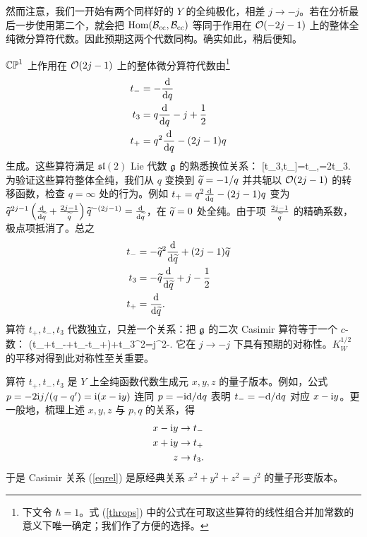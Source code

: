 然而注意，我们一开始有两个同样好的 $Y$ 的全纯极化，相差 $j\to-j$。若在分析最后一步使用第二个，就会把 ${\mathrm{Hom}}({\mathcal B}_{\mathrm{cc}},{\mathcal B}_{\mathrm{cc}})$ 等同于作用在 ${\mathcal O}(-2j-1)$ 上的整体全纯微分算符代数。因此预期这两个代数同构。确实如此，稍后便知。

${\mathbb{CP}}^1$ 上作用在 ${\mathcal O}(2j-1)$ 上的整体微分算符代数由\footnote{下文令 $\hbar=1$。式 (\ref{throps}) 中的公式在可取这些算符的线性组合并加常数的意义下唯一确定；我们作了方便的选择。}
\begin{align}\label{throps}    t_- & = -\frac{{\mathrm d}}{{\mathrm d} q} \cr
                     t_3 & = q\frac{{\mathrm d}}{{\mathrm d} q}-j+\frac{1}{2} \cr
                      t_+ & = q^2\frac{{\mathrm d}}{{\mathrm d} q}-(2j-1)q \end{align}
生成。这些算符满足 $\mathfrak{sl}(2)$ Lie 代数 ${\mathfrak g}$ 的熟悉换位关系：
\be\label{usrel} [t_3,t_\pm]=\pm t_\pm,\qquad [t_+,t_-]=2t_3. \ee
为验证这些算符整体全纯，我们从 $q$ 变换到 $\widetilde q=-1/q$ 并共轭以 ${\mathcal O}(2j-1)$ 的转移函数，检查 $q=\infty$ 处的行为。例如 $t_+=q^2\frac{{\mathrm d}}{{\mathrm d} q}-(2j-1)q$ 变为 $\widetilde q^{2j-1}\left(\frac{{\mathrm d}}{{\mathrm d}\widetilde q}+\frac{2j-1}{\widetilde q}\right)\widetilde q^{-(2j-1)}=\frac{{\mathrm d}}{{\mathrm d}\widetilde q}$，在 $\widetilde q=0$ 处全纯。由于项 $\frac{2j-1}{\widetilde q}$ 的精确系数，极点项抵消了。总之
\begin{align}\label{agrops} t_-& = -\widetilde q^2\frac{{\mathrm d}}{{\mathrm d}\widetilde q}+(2j-1)\widetilde q\cr
                                           t_3& = -\widetilde q\frac{{\mathrm d}}{{\mathrm d}\widetilde q}+j-\frac{1}{2} \cr
                                            t_+ & = \frac{{\mathrm d}}{{\mathrm d}\widetilde q}. \end{align}
算符 $t_+,t_-,t_3$ 代数独立，只差一个关系：把 ${\mathfrak g}$ 的二次 Casimir 算符等于一个 $c$-数：
\be\label{eqrel} (t_+t_-+t_-t_+)+t_3^2=j^2-. \ee
它在 $j\to-j$ 下具有预期的对称性。$K_W^{1/2}$ 的平移对得到此对称性至关重要。

算符 $t_+,t_-,t_3$ 是 $Y$ 上全纯函数代数生成元 $x,y,z$ 的量子版本。例如，公式 $p=-2{\mathrm i} j/(q-q')={\mathrm i}(x-{\mathrm i} y)$ 连同 $p=-{\mathrm i}{\mathrm d}/{\mathrm d} q$ 表明 $t_-=-{\mathrm d}/{\mathrm d} q$ 对应 $x-{\mathrm i} y$。更一般地，梳理上述 $x,y,z$ 与 $p,q$ 的关系，得
\begin{align} \label{correspo} x-{\mathrm i} y &\to t_- \cr
                                             x+{\mathrm i} y &\to t_+ \cr
                                             z& \to t_3. \end{align}
于是 Casimir 关系 (\ref{eqrel}) 是原经典关系 $x^2+y^2+z^2=j^2$ 的量子形变版本。


